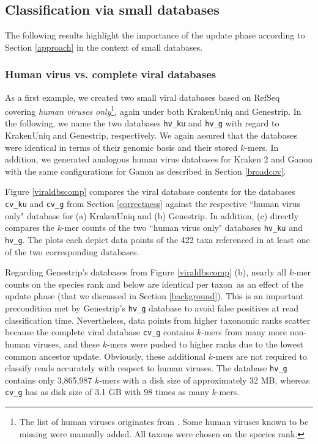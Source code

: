\documentclass[pdflatex,sn-vancouver-num]{sn-jnl}
\newcommand{\taxon}{taxon}
\begin{document}
    \subsection{Classification via small databases}
    \label{accuracy}

    The following results highlight the importance of the update phase according to Section \ref{approach} in the context of small databases.

\subsubsection{Human virus vs. complete viral databases}

    As a first example, we created two small viral databases based on RefSeq covering \emph{human viruses only}\footnote{The list of human viruses originates from \cite{viralzone}. Some human viruses known to be missing were manually added. All \taxon s were chosen on the species rank.}, again under both KrakenUniq and Genestrip.  In the following, we name the two databases \texttt{hv\_ku} and \texttt{hv\_g} with regard to KrakenUniq and Genestrip, respectively. We again assured that the databases were identical in terms of their genomic basis and their stored $k$-mers. In addition, we generated analogous human virus databases for Kraken 2 and Ganon with the same configurations for Ganon as described in Section \ref{broadcov}.
        
    Figure \ref{viraldbscomp} compares the viral database contents for the databases \texttt{cv\_ku} and \texttt{cv\_g} from Section \ref{correctness} against the respective ``human virus only" database for (a) KrakenUniq and (b) Genestrip. In addition, (c) directly compares the $k$-mer counts of the two ``human virus only" databases \texttt{hv\_ku} and \texttt{hv\_g}. The plots each depict data points of the 422 taxa referenced in at least one of the two corresponding databases.

    Regarding Genestrip's databases from Figure \ref{viraldbscomp} (b), nearly all $k$-mer counts on the species rank and below are identical per \taxon\ as an effect of the update phase (that we discussed in Section \ref{background}). This is an important precondition met by Genestrip's \texttt{hv\_g} database to avoid false positives at read classification time. Nevertheless, data points from higher taxonomic ranks scatter because the complete viral database  \texttt{cv\_g} contains $k$-mers from many more non-human viruses, and these $k$-mers were pushed to higher ranks due to the lowest common ancestor update. Obviously, these additional $k$-mers are not required to classify reads accurately with respect to human viruses. The database \texttt{hv\_g} contains only 3,865,987 $k$-mers with a disk size of approximately 32 MB, whereas \texttt{cv\_g} has as disk size of 3.1 GB with 98 times as many $k$-mers.
\end{document}
